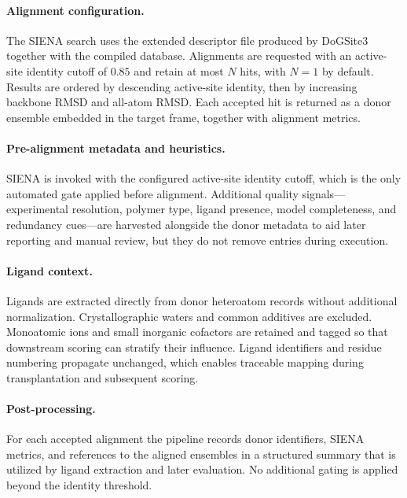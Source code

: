 \paragraph{Alignment configuration.}
The SIENA search uses the extended descriptor file produced by DoGSite3 together with the compiled database. Alignments are requested with an active-site identity cutoff of $0.85$ and retain at most $N$ hits, with $N=1$ by default. Results are ordered by descending active-site identity, then by increasing backbone RMSD and all-atom RMSD. Each accepted hit is returned as a donor ensemble embedded in the target frame, together with alignment metrics.

\paragraph{Pre-alignment metadata and heuristics.}
SIENA is invoked with the configured active-site identity cutoff, which is the only automated gate applied before alignment. Additional quality signals—experimental resolution, polymer type, ligand presence, model completeness, and redundancy cues—are harvested alongside the donor metadata to aid later reporting and manual review, but they do not remove entries during execution.

\paragraph{Ligand context.}
Ligands are extracted directly from donor heteroatom records without additional normalization. Crystallographic waters and common additives are excluded. Monoatomic ions and small inorganic cofactors are retained and tagged so that downstream scoring can stratify their influence. Ligand identifiers and residue numbering propagate unchanged, which enables traceable mapping during transplantation and subsequent scoring.

\paragraph{Post-processing.}
For each accepted alignment the pipeline records donor identifiers, SIENA metrics, and references to the aligned ensembles in a structured summary that is utilized by ligand extraction and later evaluation. No additional gating is applied beyond the identity threshold.

